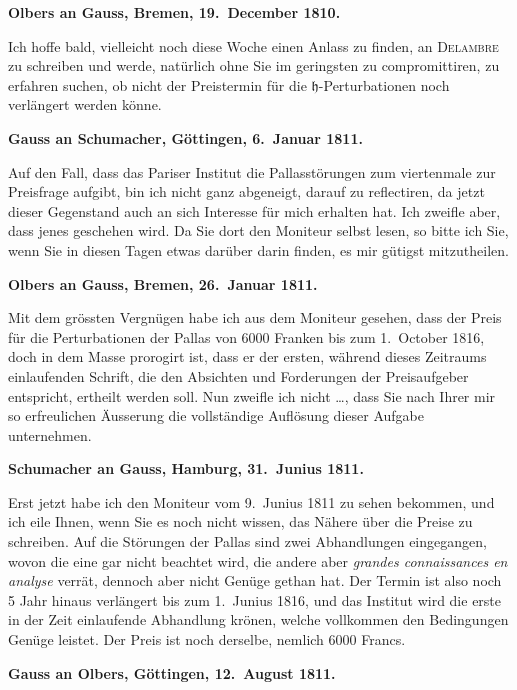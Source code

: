 \documentclass[12pt,a4paper]{article}
\newcommand{\Jupiter}{\mathfrak{h}}
\begin{document}
\newpage
\setcounter{page}{429}
%
\medskip\noindent
\textbf{Olbers an Gauss, Bremen, 19.~December 1810.}

{ Ich hoffe bald, vielleicht noch diese Woche einen Anlass zu finden, an \textsc{Delambre} zu schreiben und werde, natürlich ohne Sie im geringsten zu compromittiren, zu erfahren suchen, ob nicht der Preistermin für die $\Jupiter$-Perturbationen noch verlängert werden könne. }

\medskip\noindent
\textbf{Gauss an Schumacher, Göttingen, 6.~Januar 1811.}

Auf den Fall, dass das Pariser Institut die Pallasstörungen zum viertenmale zur Preisfrage aufgibt, bin ich nicht ganz abgeneigt, darauf zu reflectiren, da jetzt dieser Gegenstand auch an sich Interesse für mich erhalten hat. Ich zweifle aber, dass jenes geschehen wird. Da Sie dort den Moniteur selbst lesen, so bitte ich Sie, wenn Sie in diesen Tagen etwas darüber darin finden, es mir gütigst mitzutheilen.

\medskip\noindent
\textbf{Olbers an Gauss, Bremen, 26.~Januar 1811.}

{ Mit dem grössten Vergnügen habe ich aus dem Moniteur gesehen, dass der Preis für die Perturbationen der Pallas von 6000 Franken bis zum 1.~October 1816, doch in dem Masse prorogirt ist, dass er der ersten, während dieses Zeitraums einlaufenden Schrift, die den Absichten und Forderungen der Preisaufgeber entspricht, ertheilt werden soll. Nun zweifle ich nicht \ldots, dass Sie nach Ihrer mir so erfreulichen Äusserung die vollständige Auflösung dieser Aufgabe unternehmen. }

\medskip\noindent
\textbf{Schumacher an Gauss, Hamburg, 31.~Junius 1811.}

{Erst jetzt habe ich den Moniteur vom 9.~Junius 1811 zu sehen bekommen, und ich eile Ihnen, wenn Sie es noch nicht wissen, das Nähere über die Preise zu schreiben. Auf die Störungen der Pallas sind zwei Abhandlungen eingegangen, wovon die eine gar nicht beachtet wird, die andere aber \textit{grandes connaissances en analyse} verrät, dennoch aber nicht Genüge gethan hat. Der Termin ist also noch 5 Jahr hinaus verlängert bis zum 1.~Junius 1816, und das Institut wird die erste in der Zeit einlaufende Abhandlung krönen, welche vollkommen den Bedingungen Genüge leistet. Der Preis ist noch derselbe, nemlich 6000 Francs.}

\newpage
\setcounter{page}{430}
%
\medskip\noindent
\textbf{Gauss an Olbers, Göttingen, 12.~August 1811.}
\end{document}
